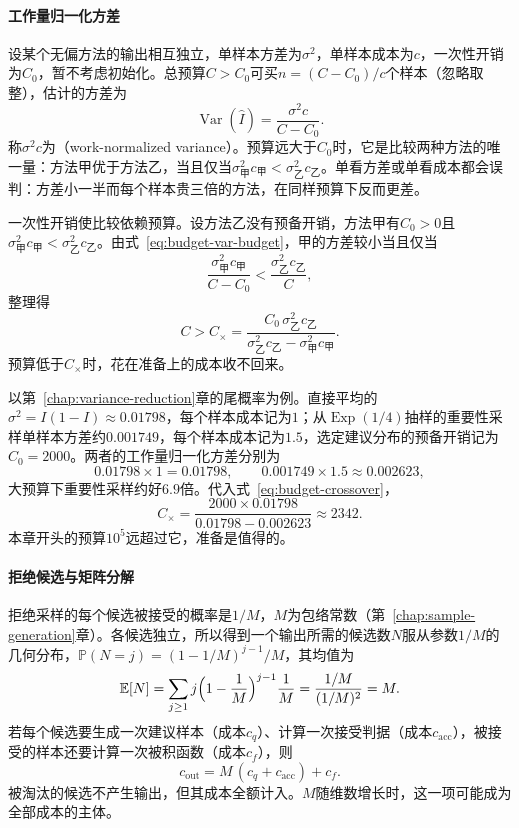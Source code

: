 \paragraph{工作量归一化方差}
设某个无偏方法的输出相互独立，单样本方差为$\sigma^{2}$，单样本成本为$c$，一次性开销为$C_{0}$，暂不考虑初始化。总预算$C>C_{0}$可买$n=(C-C_{0})/c$个样本（忽略取整），估计的方差为
\begin{equation}
  \operatorname{Var}(\hat{I})=\frac{\sigma^{2}c}{C-C_{0}} .
  \label{eq:budget-var-budget}
\end{equation}
称$\sigma^{2}c$为（work-normalized variance）。预算远大于$C_{0}$时，它是比较两种方法的唯一量：方法甲优于方法乙，当且仅当$\sigma_{\text{甲}}^{2}c_{\text{甲}}<\sigma_{\text{乙}}^{2}c_{\text{乙}}$。单看方差或单看成本都会误判：方差小一半而每个样本贵三倍的方法，在同样预算下反而更差。

一次性开销使比较依赖预算。设方法乙没有预备开销，方法甲有$C_{0}>0$且$\sigma_{\text{甲}}^{2}c_{\text{甲}}<\sigma_{\text{乙}}^{2}c_{\text{乙}}$。由式~\eqref{eq:budget-var-budget}，甲的方差较小当且仅当
\[
  \frac{\sigma_{\text{甲}}^{2}c_{\text{甲}}}{C-C_{0}}<\frac{\sigma_{\text{乙}}^{2}c_{\text{乙}}}{C},
\]
整理得
\begin{equation}
  C>C_{\times}=\frac{C_{0}\,\sigma_{\text{乙}}^{2}c_{\text{乙}}}{\sigma_{\text{乙}}^{2}c_{\text{乙}}-\sigma_{\text{甲}}^{2}c_{\text{甲}}} .
  \label{eq:budget-crossover}
\end{equation}
预算低于$C_{\times}$时，花在准备上的成本收不回来。

以第~\ref{chap:variance-reduction}章的尾概率为例。直接平均的$\sigma^{2}=I(1-I)\approx0.01798$，每个样本成本记为$1$；从$\operatorname{Exp}(1/4)$抽样的重要性采样单样本方差约$0.001749$，每个样本成本记为$1.5$，选定建议分布的预备开销记为$C_{0}=2000$。两者的工作量归一化方差分别为
\[
  0.01798\times1=0.01798,\qquad0.001749\times1.5\approx0.002623,
\]
大预算下重要性采样约好$6.9$倍。代入式~\eqref{eq:budget-crossover}，
\[
  C_{\times}=\frac{2000\times0.01798}{0.01798-0.002623}\approx2342 .
\]
本章开头的预算$10^{5}$远超过它，准备是值得的。

\paragraph{拒绝候选与矩阵分解}
拒绝采样的每个候选被接受的概率是$1/M$，$M$为包络常数（第~\ref{chap:sample-generation}章）。各候选独立，所以得到一个输出所需的候选数$N$服从参数$1/M$的几何分布，$\mathbb{P}(N=j)=(1-1/M)^{j-1}/M$，其均值为
\[
  \mathbb{E}[N]=\sum_{j\ge1}j\Bigl(1-\frac1M\Bigr)^{j-1}\frac1M=\frac{1/M}{(1/M)^{2}}=M .
\]
若每个候选要生成一次建议样本（成本$c_{q}$）、计算一次接受判据（成本$c_{\mathrm{acc}}$），被接受的样本还要计算一次被积函数（成本$c_{f}$），则
\begin{equation}
  c_{\mathrm{out}}=M\,(c_{q}+c_{\mathrm{acc}})+c_{f} .
  \label{eq:budget-rejection-cost}
\end{equation}
被淘汰的候选不产生输出，但其成本全额计入。$M$随维数增长时，这一项可能成为全部成本的主体。

